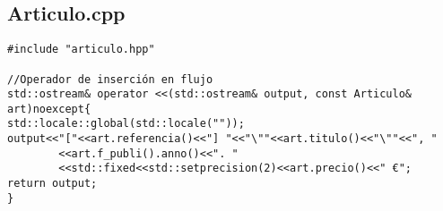 \subsection{Articulo.cpp}
\begin{verbatim}
#include "articulo.hpp"

//Operador de inserción en flujo
std::ostream& operator <<(std::ostream& output, const Articulo& art)noexcept{
std::locale::global(std::locale(""));
output<<"["<<art.referencia()<<"] "<<"\""<<art.titulo()<<"\""<<", "
        <<art.f_publi().anno()<<". "
        <<std::fixed<<std::setprecision(2)<<art.precio()<<" €";
return output;
}
\end{verbatim}